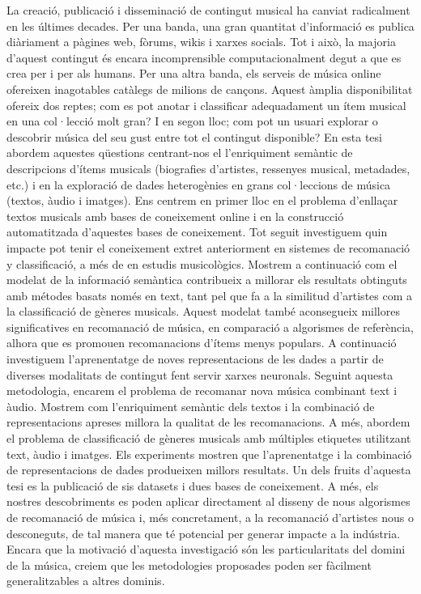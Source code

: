 La creació, publicació i disseminació de contingut musical ha canviat radicalment en les últimes decades. Per una banda, una gran quantitat d’informació es publica diàriament a pàgines web, fòrums, wikis i xarxes socials. Tot i això, la majoria d’aquest contingut és encara incomprensible computacionalment degut a que es crea per i per als humans. Per una altra banda, els serveis de música online ofereixen inagotables catàlegs de milions de cançons. Aquest àmplia disponibilitat ofereix dos reptes; com es pot anotar i classificar adequadament un ítem musical en una col·lecció molt gran? I en segon lloc; com pot un usuari explorar o descobrir música del seu gust entre tot el contingut disponible? En esta tesi abordem aquestes qüestions centrant-nos el l’enriquiment semàntic de descripcions d’ítems musicals (biografies d’artistes, ressenyes musical, metadades, etc.) i en la exploració de dades heterogènies en grans col·leccions de música (textos, àudio i imatges). Ens centrem en primer lloc en el problema d’enllaçar textos musicals amb bases de coneixement online i en la construcció automatitzada d’aquestes bases de coneixement.
Tot seguit investiguem quin impacte pot tenir el coneixement extret anteriorment en sistemes de recomanació y classificació, a més de en estudis musicològics. Mostrem a continuació com el modelat de la informació semàntica contribueix a millorar els resultats obtinguts amb métodes basats només en text, tant pel que fa a la similitud d’artistes com a la classificació de gèneres musicals.  Aquest modelat també aconsegueix millores significatives en recomanació de música, en comparació a algorismes de referència, alhora que es promouen recomanacions d’ítems menys populars. A continuació investiguem l'aprenentatge de noves representacions de les dades a partir de diverses modalitats de contingut fent servir xarxes neuronals. Seguint aquesta metodologia, encarem el problema de recomanar nova música combinant text i àudio. Mostrem com l’enriquiment semàntic dels textos i la combinació de representacions apreses millora la qualitat de les recomanacions. A més, abordem el problema de classificació de gèneres musicals amb múltiples etiquetes utilitzant text, àudio i imatges. Els experiments mostren que l’aprenentatge i la combinació de representacions de dades produeixen millors resultats. Un dels fruits d’aquesta tesi es la publicació de sis datasets i dues bases de coneixement. A més, els nostres descobriments es poden aplicar directament al disseny de nous algorismes de recomanació de música i, més concretament, a la recomanació d’artistes nous o desconeguts, de tal manera que té potencial per generar impacte a la indústria. Encara que la motivació d’aquesta investigació són les particularitats del domini de la música, creiem que les metodologies proposades poden ser fàcilment generalitzables a altres dominis.  
